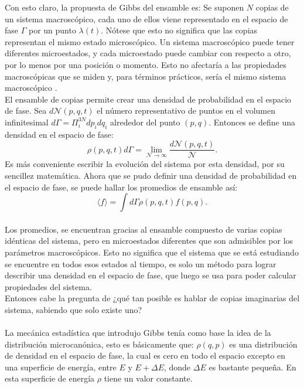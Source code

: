 Con esto claro, la propuesta de Gibbs del ensamble es: Se suponen $N$ copias de un sistema macroscópico, cada uno de ellos viene representado en el espacio de fase $\Gamma$ por un punto $\lambda(t)$. Nótese que esto no significa  que las copias representan el mismo estado microscópico. Un sistema macroscópico puede tener diferentes microestados, y cada microestado puede cambiar con respecto a otro, por lo menos por una posición o momento. Esto no afectaría a las propiedades macroscópicas que se miden y, para términos prácticos, sería el mismo sistema macroscópico \cite{KardarStat}.
\\
El ensamble de copias permite crear una densidad de probabilidad en el espacio de fase. Sea $d\mathcal{N}(p,q,t)$ el número representativo de puntos en el volumen infinitesimal $d\Gamma = \Pi^{3N}_{i}dp_{i}dq_{i}$ alrededor del punto $(p,q)$. Entonces se define una densidad en el espacio de fase:
\begin{equation}
\rho(p,q,t)d\Gamma= \lim_{\mathcal{N} \to \infty} \frac{d\mathcal{N}(p,q,t)}{\mathcal{N}}.
\end{equation}
Es más conveniente escribir la evolución del sistema por esta densidad, por su sencillez matemática. 
Ahora que se pudo definir una densidad de probabilidad en el espacio de fase, se puede hallar los promedios de ensamble así:
\begin{equation}
\langle f \rangle = \int d\Gamma \rho(p,q,t) f(p,q).
\end{equation}
\\
Los promedios, se encuentran gracias al ensamble compuesto de varias copias idénticas del sistema, pero en microestados diferentes que son admisibles por los parámetros macroscópicos. Esto no significa que el sistema que se está estudiando se encuentre en todos esos estados al tiempo, es solo un método para lograr describir una densidad en el espacio de fase, que luego se usa para poder calcular propiedades del sistema.\\
Entonces cabe la pregunta de ¿qué tan posible es hablar de copias imaginarias del sistema, sabiendo que solo existe uno?
\\
\\
La mecánica estadística que introdujo Gibbs tenía como base la idea de la distribución microcanónica, esto es básicamente que: $\rho(q,p)$ es una distribución de densidad en el espacio de fase, la cual es cero en todo el espacio excepto en una superficie de energía, entre $E$ y $E+ \Delta E$, donde $\Delta E$ es bastante pequeña. En esta superficie de energía $\rho$ tiene un valor constante.
